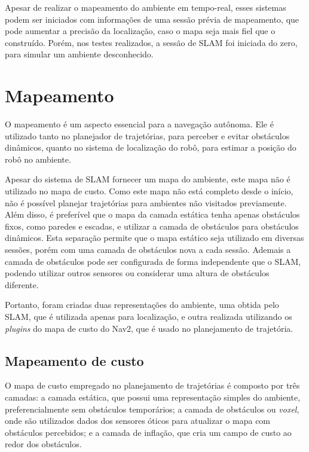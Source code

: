 \documentclass[repeatfields,xlists,xpacks,oneside,yearsonly]{ufrgscca}
\begin{document}
Apesar de realizar o mapeamento do ambiente em tempo-real, esses
sistemas podem ser iniciados com informações de uma sessão prévia de
mapeamento, que pode aumentar a precisão da localização, caso o mapa
seja mais fiel que o construído. Porém, nos testes realizados, a
sessão de SLAM foi iniciada do zero, para simular um ambiente
desconhecido.

\section{Mapeamento}

O mapeamento é um aspecto essencial para a navegação autônoma. Ele é
utilizado tanto no planejador de trajetórias, para perceber e evitar
obstáculos dinâmicos, quanto no sistema de localização do robô, para
estimar a posição do robô no ambiente.

Apesar do sistema de SLAM fornecer um mapa do ambiente, este mapa não
é utilizado no mapa de custo. Como este mapa não está completo desde
o início, não é possível planejar trajetórias para ambientes não
visitados previamente. Além disso, é preferível que o mapa da camada
estática tenha apenas obstáculos fixos, como paredes e escadas, e
utilizar a camada de obstáculos para obstáculos dinâmicos. Esta
separação permite que o mapa estático seja utilizado em diversas
sessões, porém com uma camada de obstáculos nova a cada sessão.
Ademais a camada de obstáculos pode ser configurada de forma
independente que o SLAM, podendo utilizar outros sensores ou
considerar uma altura de obstáculos diferente.

Portanto, foram criadas duas representações do ambiente, uma obtida
pelo SLAM, que é utilizada apenas para localização, e outra realizada
utilizando os \textit{plugins} do mapa de custo do Nav2, que é usado
no planejamento de trajetória.

\subsection{Mapeamento de custo}

O mapa de custo empregado no planejamento de trajetórias é composto
por três camadas: a camada estática, que possui uma representação
simples do ambiente, preferencialmente sem obstáculos temporários; a
camada de obstáculos ou \textit{voxel}, onde são utilizados dados dos
sensores óticos para atualizar o mapa com obstáculos percebidos; e a
camada de inflação, que cria um campo de custo ao redor dos
obstáculos.
\end{document}
